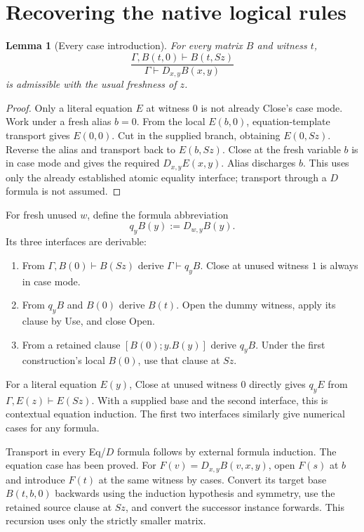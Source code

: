 \documentclass[11pt,letterpaper]{article}
\newtheorem{lemma}[theorem]{Lemma}
\begin{document}
\section{Recovering the native logical rules}
\label{sec:rp-logic}

\begin{lemma}[Every case introduction]
\label{lem:rp-case}
For every matrix $B$ and witness $t$,
\[
 \frac{\Gamma,B(t,0)\vdash B(t,Sz)}
      {\Gamma\vdash D_{x,y}B(x,y)}
\]
is admissible with the usual freshness of $z$.
\end{lemma}
\begin{proof}
Only a literal equation $E$ at witness $0$ is not already Close's case
mode.  Work under a fresh alias $b=0$.  From the local $E(b,0)$,
equation-template transport gives $E(0,0)$.  Cut in the supplied branch,
obtaining $E(0,Sz)$.  Reverse the alias and transport back to
$E(b,Sz)$.  Close at the fresh variable $b$ is in case mode and gives
the required $D_{x,y}E(x,y)$.  Alias discharges $b$.
This uses only the already established atomic equality interface;
transport through a $D$ formula is not assumed.
\end{proof}

For fresh unused $w$, define the formula abbreviation
\[
 q_yB(y):=D_{w,y}B(y).
\]
Its three interfaces are derivable:
\begin{enumerate}
\item From $\Gamma,B(0)\vdash B(Sz)$ derive $\Gamma\vdash q_yB$.
      Close at unused witness $1$ is always in case mode.
\item From $q_yB$ and $B(0)$ derive $B(t)$.  Open the dummy witness,
      apply its clause by Use, and close Open.
\item From a retained clause $[B(0);y.B(y)]$ derive $q_yB$.  Under
      the first construction's local $B(0)$, use that clause at $Sz$.
\end{enumerate}
For a literal equation $E(y)$, Close at unused witness $0$ directly
gives $q_yE$ from $\Gamma,E(z)\vdash E(Sz)$.  With a supplied base
and the second interface, this is contextual equation induction.
The first two interfaces similarly give numerical cases for any formula.

Transport in every Eq/$D$ formula follows by external formula induction.
The equation case has been proved.  For $F(v)=D_{x,y}B(v,x,y)$, open
$F(s)$ at $b$ and introduce $F(t)$ at the same witness by cases.
Convert its target base $B(t,b,0)$ backwards using the induction
hypothesis and symmetry, use the retained source clause at $Sz$, and
convert the successor instance forwards.  This recursion uses only the
strictly smaller matrix.
\end{document}
